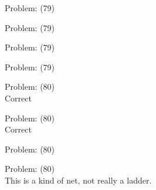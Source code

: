 \documentclass[11pt]{article}
\begin{document}
\begin{minipage}[t]{0.5\textwidth}
  {\centering
  
  Problem: (79)\\
  
  }
\end{minipage}
\begin{minipage}[t]{0.5\textwidth}
  {\centering
  
  Problem: (79)\\
  
  }
\end{minipage}
\begin{minipage}[t]{0.5\textwidth}
  {\centering
  
  Problem: (79)\\
  
  }
\end{minipage}
\begin{minipage}[t]{0.5\textwidth}
  {\centering
  
  Problem: (79)\\
  
  }
\end{minipage}
\begin{minipage}[t]{0.5\textwidth}
  {\centering
  
  Problem: (80)\\
  Correct\\
  }
\end{minipage}
\begin{minipage}[t]{0.5\textwidth}
  {\centering
  
  Problem: (80)\\
  Correct\\
  }
\end{minipage}
\begin{minipage}[t]{0.5\textwidth}
  {\centering
  
  Problem: (80)\\
  
  }
\end{minipage}
\begin{minipage}[t]{0.5\textwidth}
  {\centering
  
  Problem: (80)\\
  This is a kind of net, not really a ladder.\\
  }
\end{minipage}
\end{document}
